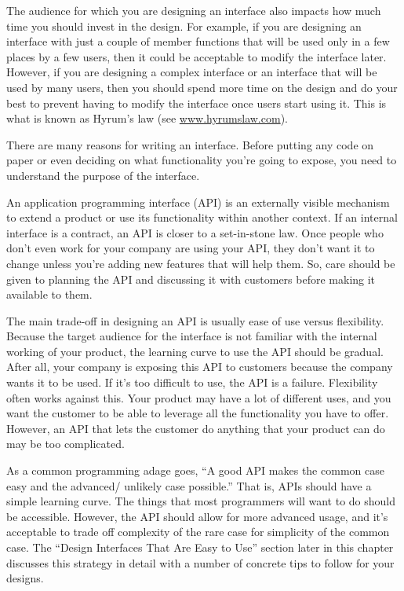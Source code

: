 The audience for which you are designing an interface also impacts how much time you should invest in the design. For example, if you are designing an interface with just a couple of member functions that will be used only in a few places by a few users, then it could be acceptable to modify the interface later. However, if you are designing a complex interface or an interface that will be used by many users, then you should spend more time on the design and do your best to prevent having to modify the interface once users start using it. This is what is known as Hyrum’s law (see \url{www.hyrumslaw.com}).


There are many reasons for writing an interface. Before putting any code on paper or even deciding on what functionality you’re going to expose, you need to understand the purpose of the interface.


An application programming interface (API) is an externally visible mechanism to extend a product or use its functionality within another context. If an internal interface is a contract, an API is closer to a set-in-stone law. Once people who don’t even work for your company are using your API, they don’t want it to change unless you’re adding new features that will help them. So, care should be given to planning the API and discussing it with customers before making it available to them.

The main trade-off in designing an API is usually ease of use versus flexibility. Because the target audience for the interface is not familiar with the internal working of your product, the learning curve to use the API should be gradual. After all, your company is exposing this API to customers because the company wants it to be used. If it’s too difficult to use, the API is a failure. Flexibility often works against this. Your product may have a lot of different uses, and you want the customer to be able to leverage all the functionality you have to offer. However, an API that lets the customer do anything that your product can do may be too complicated.

As a common programming adage goes, “A good API makes the common case easy and the advanced/ unlikely case possible.” That is, APIs should have a simple learning curve. The things that most programmers will want to do should be accessible. However, the API should allow for more advanced usage, and it’s acceptable to trade off complexity of the rare case for simplicity of the common case. The “Design Interfaces That Are Easy to Use” section later in this chapter discusses this strategy in detail with a number of concrete tips to follow for your designs.

